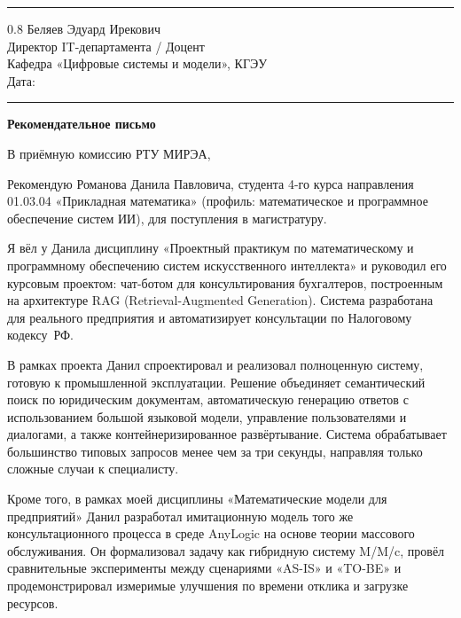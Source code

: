 \documentclass[a4paper,12pt]{article}
\begin{document}
\vspace{4pt}
\noindent\rule{\textwidth}{0.8pt}

\begin{flushright}
  \begin{spacing}{0.8}
    Беляев Эдуард Ирекович\\
    Директор IT-департамента / Доцент\\
    Кафедра «Цифровые системы и модели», КГЭУ\\[6pt]
    Дата: \rule{4cm}{0.4pt}
  \end{spacing}
\end{flushright}

\begin{center}
  {\Large\bfseries Рекомендательное письмо}
\end{center}

В приёмную комиссию РТУ МИРЭА,

Рекомендую Романова Данила Павловича, студента 4-го курса направления 01.03.04 «Прикладная математика» (профиль: ма\-те\-ма\-ти\-че\-ское и про\-грамм\-ное обес\-пе\-че\-ние систем ИИ), для по\-сту\-пле\-ния в ма\-ги\-стра\-ту\-ру.

Я вёл у Данила дисциплину «Проектный практикум по математическому и программному обеспечению систем искусственного интеллекта» и руководил его курсовым проектом: чат-ботом для консультирования бухгалтеров, построенным на архитектуре RAG (Retrieval-Augmented Generation). Система разработана для реального предприятия и автоматизирует консультации по Налоговому кодексу~РФ.

В рамках проекта Данил спроектировал и реализовал полноценную систему, готовую к промышленной эксплуатации. Решение объединяет семантический поиск по юридическим документам, автоматическую генерацию ответов с использованием большой языковой модели, управление пользователями и диалогами, а также контейнеризированное развёртывание. Система обрабатывает большинство типовых запросов менее чем за три секунды, направляя только сложные случаи к специалисту.

Кроме того, в рамках моей дисциплины «Математические модели для предприятий» Данил разработал имитационную модель того же консультационного процесса в среде AnyLogic на основе теории массового обслуживания. Он формализовал задачу как гибридную систему M/M/c, провёл сравнительные эксперименты между сценариями «AS-IS» и «TO-BE» и продемонстрировал измеримые улучшения по времени отклика и загрузке ресурсов.
\end{document}

